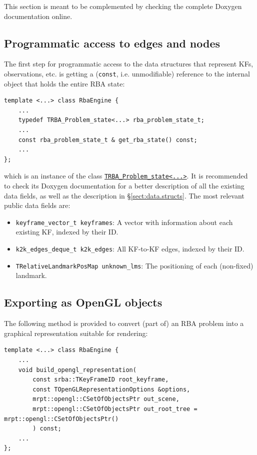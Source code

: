\documentclass[a4paper,11pt]{article}
\begin{document}
This section is meant to be complemented by checking the complete Doxygen documentation online.

\subsection{Programmatic access to edges and nodes}

The first step for programmatic access to the data structures that 
represent KFs, observations, etc. is getting a (\texttt{const}, i.e. unmodifiable) 
reference to the internal object that holds the entire RBA state:

\begin{lstlisting}
template <...> class RbaEngine {
    ...
	typedef TRBA_Problem_state<...> rba_problem_state_t;
	...
	const rba_problem_state_t & get_rba_state() const;
    ...
};
\end{lstlisting}

\noindent which is an instance of the class 
\href{http://reference.mrpt.org/svn/structmrpt_1_1srba_1_1_t_r_b_a___problem__state.html}
{\texttt{TRBA\_Problem\_state<...>}}. It is recommended to check its Doxygen documentation
for a better description of all the existing data fields, as well as the description in \S\ref{sect:data.structs}.
The most relevant public data fields are:
\begin{itemize}
\item \texttt{keyframe\_vector\_t keyframes}: A vector with information about each existing KF, indexed by their ID.
\item \texttt{k2k\_edges\_deque\_t k2k\_edges}: All KF-to-KF edges, indexed by their ID.
\item \texttt{TRelativeLandmarkPosMap unknown\_lms}: The positioning of each (non-fixed) landmark.
\end{itemize}


\newpage
\subsection{Exporting as OpenGL objects}

The following method is provided to convert (part of) an RBA problem into a graphical representation 
suitable for rendering:

\begin{lstlisting}
template <...> class RbaEngine {
    ...
	void build_opengl_representation(
		const srba::TKeyFrameID root_keyframe,
		const TOpenGLRepresentationOptions &options,
		mrpt::opengl::CSetOfObjectsPtr out_scene,
		mrpt::opengl::CSetOfObjectsPtr out_root_tree = mrpt::opengl::CSetOfObjectsPtr()
		) const;
    ...
};
\end{lstlisting}
\end{document}
